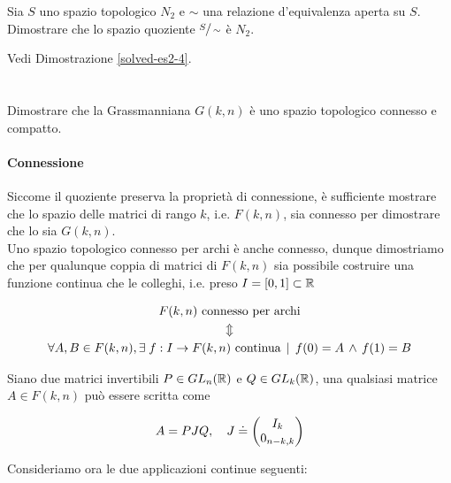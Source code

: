 \begin{tcolorbox}
	Sia $ S $ uno spazio topologico $ N_{2} $ e $ \sim $ una relazione d'equivalenza aperta su $ S $. Dimostrare che lo spazio quoziente $ \sfrac{S}{\sim} $ è $ N_{2} $.
\end{tcolorbox}

Vedi Dimostrazione \ref{solved-es2-4}.

%

\newpage

%

\section{}\label{es2-5}

\begin{tcolorbox}
	Dimostrare che la Grassmanniana $ G(k,n) $ è uno spazio topologico connesso e compatto.
\end{tcolorbox}

\paragraph{Connessione}

Siccome il quoziente preserva la proprietà di connessione, è sufficiente mostrare che lo spazio delle matrici di rango $ k $, i.e. $ F(k,n) $, sia connesso per dimostrare che lo sia $ G(k,n) $.\\
Uno spazio topologico connesso per archi è anche connesso, dunque dimostriamo che per qualunque coppia di matrici di $ F(k,n) $ sia possibile costruire una funzione continua che le colleghi, i.e. preso $ I = [0,1] \subset \mathbb{R} $

\begin{gather}
	F(k,n) \text{ connesso per archi} \nonumber\\
	\Updownarrow\\
	\forall A, B \in F(k,n), \E f : I \to F(k,n) \text{ continua} %
	\, \mid \, f(0) = A \, \wedge \, f(1) = B \nonumber
\end{gather}

Siano due matrici invertibili $ P \in GL_{n}(\mathbb{R}) $ e $ Q \in GL_{k}(\mathbb{R}) $, una qualsiasi matrice $ A \in F(k,n) $ può essere scritta come

\begin{equation}
	A = P J Q \qcomma J \doteq \pmqty{I_{k} \\ 0_{n-k,k}}
\end{equation}

Consideriamo ora le due applicazioni continue seguenti:

